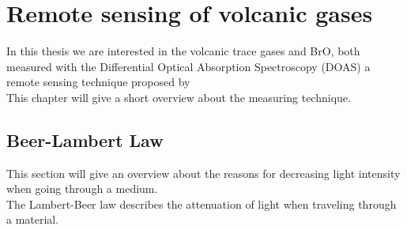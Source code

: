 \documentclass  [
  paper    = a4,
  BCOR     = 10mm,
  twoside,
  fontsize = 12pt,
  fleqn,
  toc      = bibnumbered,
  toc      = listofnumbered,
  numbers  = noendperiod,
  headings = normal,
  listof   = leveldown,
  version  = 3.03
]                                       {scrreprt}
\begin{document}
	\chapter{Remote sensing of volcanic gases}
	In this thesis we are interested in the volcanic trace gases  and BrO, both measured with the Differential Optical Absorption Spectroscopy (DOAS) a remote sensing technique proposed by \cite{platt2008differential}\\
	This chapter will give a short overview about the measuring technique.
	

	\section*{Beer-Lambert Law}
	This section will give an overview about the reasons for decreasing light intensity when going through a medium.\\
	The Lambert-Beer law describes the attenuation of light when traveling through a material.\\
\end{document}
